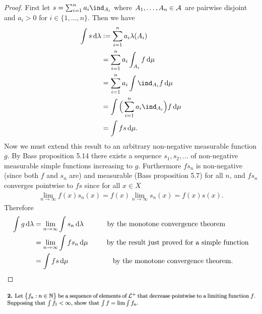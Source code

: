 \begin{proof}
  First let $s = \sum_{i=1}^n a_i \ind_{A_i}$ where $A_1, \ldots, A_n \in \mathcal A$ are pairwise disjoint and $a_i > 0$ for $i \in \{1, \ldots, n\}$. Then we have
  \begin{align*}
    \int s \d\lambda
    &:= \sum_{i=1}^n a_i \lambda(A_i) \\
    &= \sum_{i=1}^n a_i \int_{A_i} f \d\mu \\
    &= \sum_{i=1}^n a_i \int \ind_{A_i} f \d\mu \\
    &= \int \Big(\sum_{i=1}^n a_i \ind_{A_i}\Big) f \d\mu \\
    &= \int f s \d\mu.
  \end{align*}
  Now we must extend this result to an arbitrary non-negative measurable function $g$. By Bass proposition 5.14
  there exists a sequence $s_1, s_2, \ldots$ of non-negative measurable simple functions increasing to $g$.
  Furthermore $fs_n$ is non-negative (since both $f$ and $s_n$ are) and measurable (Bass proposition 5.7) for
  all $n$, and $fs_n$ converges pointwise to $fs$ since for all $x \in X$
  \begin{align*}
    \lim_{n \to \infty} f(x)s_n(x) = f(x)\lim_{n \to \infty} s_n(x) = f(x)s(x).
  \end{align*}
  Therefore
  \begin{align*}
    \int g \d\lambda
    &= \lim_{n \to \infty} \int s_n \d\lambda ~~~~~~~~~~ \text{by the monotone convergence theorem}\\
    &= \lim_{n \to \infty} \int f s_n \d\mu  ~~~~~~~~ \text{by the result just proved for a simple function} \\
    &= \int f s \d\mu  ~~~~~~~~~~~~~~~~~~~ \text{by the monotone convergence theorem.}
  \end{align*}
\end{proof}

\newpage
\begin{mdframed}
\includegraphics[width=400pt]{img/analysis--berkeley-202a-hw07-afc1.png}
\end{mdframed}

